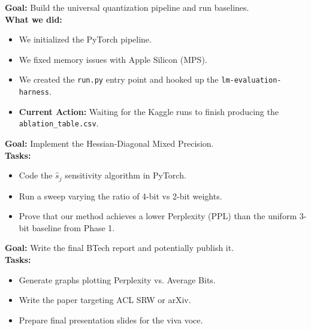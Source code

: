 \documentclass[12pt, a4paper]{article}
\begin{document}
\begin{tcolorbox}[colback=green!5!white,colframe=green!60!black,title=Phase 0 \& 1: The Foundation (Completed \& Active)]
\textbf{Goal:} Build the universal quantization pipeline and run baselines.\\
\textbf{What we did:} 
\begin{itemize}[leftmargin=*]
    \item We initialized the PyTorch pipeline.
    \item We fixed memory issues with Apple Silicon (MPS).
    \item We created the \texttt{run.py} entry point and hooked up the \texttt{lm-evaluation-harness}.
    \item \textbf{Current Action:} Waiting for the Kaggle runs to finish producing the \texttt{ablation\_table.csv}.
\end{itemize}
\end{tcolorbox}

\begin{tcolorbox}[colback=yellow!5!white,colframe=yellow!70!black,title=Phase 2: The Novelty (Upcoming Jan--Feb 2027)]
\textbf{Goal:} Implement the Hessian-Diagonal Mixed Precision.\\
\textbf{Tasks:} 
\begin{itemize}[leftmargin=*]
    \item Code the $\hat{s}_j$ sensitivity algorithm in PyTorch.
    \item Run a sweep varying the ratio of 4-bit vs 2-bit weights.
    \item Prove that our method achieves a lower Perplexity (PPL) than the uniform 3-bit baseline from Phase 1.
\end{itemize}
\end{tcolorbox}

\begin{tcolorbox}[colback=red!5!white,colframe=red!70!black,title=Phase 3: Synthesis \& Publication (Upcoming Mar--May 2027)]
\textbf{Goal:} Write the final BTech report and potentially publish it.\\
\textbf{Tasks:} 
\begin{itemize}[leftmargin=*]
    \item Generate graphs plotting Perplexity vs. Average Bits.
    \item Write the paper targeting ACL SRW or arXiv.
    \item Prepare final presentation slides for the viva voce.
\end{itemize}
\end{tcolorbox}
\end{document}
